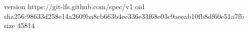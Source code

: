 version https://git-lfs.github.com/spec/v1
oid sha256:98633d258e14a2609ba8cb663b4ec336e33f68e03c9aeeab10fb8df60c51a7fb
size 45814
